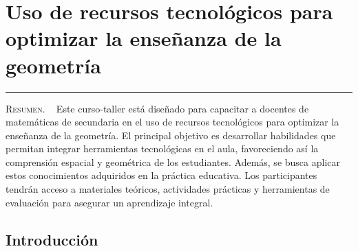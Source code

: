 \thispagestyle{portadapage}
\setcounter{subsection}{0}
\setcounter{subsubsection}{0}
\setcounter{actividad}{0}
\setcounter{actividad_previa}{0}
\setcounter{actividad_entre}{0}
\renewcommand{\articulotipo}{Taller}
\renewcommand{\articulotitulo}{Uso de recursos tecnológicos para optimizar la enseñanza de la geometría}
\renewcommand{\articulotitulocorto}{Uso de recursos tecnológicos para optimizar la enseñanza de la geometría}
\section{\articulotitulo}

\noindent\rule{\linewidth}{2pt}

\vspace{0.25cm}

\begin{flushright}
	\vspace{1em}
\end{flushright}

\vspace{0.5cm}

\begin{center}
	\begin{minipage}{0.75\linewidth} \small
		\textsc{Resumen}. ~
		Este curso-taller está diseñado para capacitar a docentes de matemáticas de secundaria en el uso de recursos tecnológicos para optimizar la enseñanza de la geometría. El principal objetivo es desarrollar habilidades que permitan integrar herramientas tecnológicas en el aula, favoreciendo así la comprensión espacial y geométrica de los estudiantes. Además, se busca aplicar estos conocimientos adquiridos en la práctica educativa. Los participantes tendrán acceso a materiales teóricos, actividades prácticas y herramientas de evaluación para asegurar un aprendizaje integral.
	\end{minipage}
\end{center}

\subsection{Introducción}

